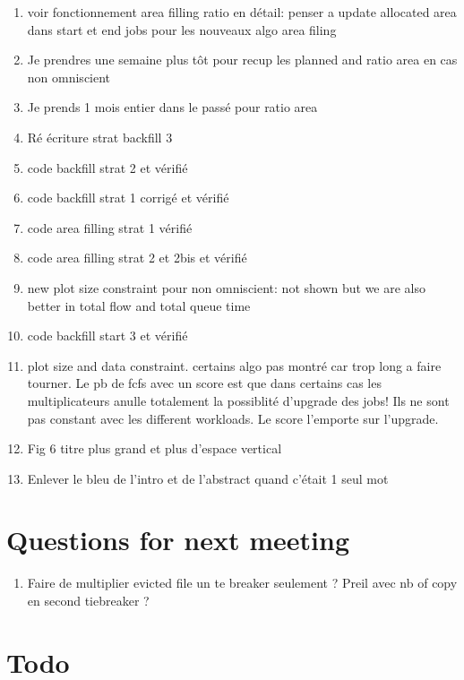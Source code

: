 \documentclass[a4paper]{article}
\begin{document}
\begin{enumerate}
		\item voir fonctionnement area filling ratio en détail: penser a update allocated area dans start et end jobs pour les nouveaux algo area filing
		\item Je prendres une semaine plus tôt pour recup les planned and ratio area en cas non omniscient
		\item Je prends 1 mois entier dans le passé pour ratio area
		\item Ré écriture strat backfill 3
		\item code backfill strat 2 et vérifié
		\item code backfill strat 1 corrigé et vérifié
		\item code area filling strat 1 vérifié
		\item code area filling strat 2 et 2bis et vérifié
		\item new plot size constraint pour non omniscient: not shown but we are also better in total flow and total queue time
		\item code backfill start 3 et vérifié
		\item plot size and data constraint. certains algo pas montré car trop long a faire tourner. Le pb de fcfs avec un score est que dans certains cas les multiplicateurs anulle totalement la possiblité d'upgrade des jobs! Ils ne sont pas constant avec les different workloads. Le score l'emporte sur l'upgrade.
		
		\item Fig 6 titre plus grand et plus d'espace vertical
		\item Enlever le bleu de l'intro et de l'abstract quand c'était 1 seul mot

	\end{enumerate}
	
\section{Questions for next meeting}
	\begin{enumerate}
		\item Faire de multiplier evicted file un te breaker seulement ? Preil avec nb of copy en second tiebreaker ?
	\end{enumerate}
	
\section{Todo}
\end{document}
